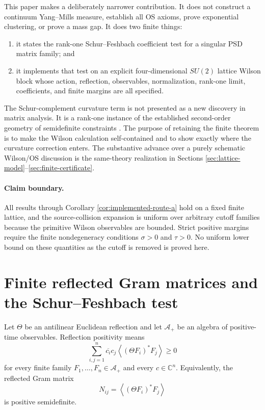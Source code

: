 \documentclass[11pt]{article}
\newcommand{\C}{\mathbb C}
\begin{document}
This paper makes a deliberately narrower contribution.  It does not construct a continuum Yang--Mills measure, establish all OS axioms, prove exponential clustering, or prove a mass gap.  It does two finite things:

\begin{enumerate}[label=(\roman*)]
  \item it states the rank-one Schur--Feshbach coefficient test for a singular PSD matrix family; and
  \item it implements that test on an explicit four-dimensional $SU(2)$ lattice Wilson block whose action, reflection, observables, normalization, rank-one limit, coefficients, and finite margins are all specified.
\end{enumerate}

The Schur-complement curvature term is not presented as a new discovery in matrix analysis.  It is a rank-one instance of the established second-order geometry of semidefinite constraints \cite{Shapiro1997,BonnansShapiro2000}.  The purpose of retaining the finite theorem is to make the Wilson calculation self-contained and to show exactly where the curvature correction enters.  The substantive advance over a purely schematic Wilson/OS discussion is the same-theory realization in Sections \ref{sec:lattice-model}--\ref{sec:finite-certificate}.

\paragraph{Claim boundary.}
All results through Corollary \ref{cor:implemented-route-a} hold on a fixed finite lattice, and the source-collision expansion is uniform over arbitrary cutoff families because the primitive Wilson observables are bounded.  Strict positive margins require the finite nondegeneracy conditions $\sigma>0$ and $\tau>0$.  No uniform lower bound on these quantities as the cutoff is removed is proved here.

\section{Finite reflected Gram matrices and the Schur--Feshbach test}
\label{sec:finite-theorem}

Let $\Theta$ be an antilinear Euclidean reflection and let $\mathcal A_+$ be an algebra of positive-time observables.  Reflection positivity means
\begin{equation}
  \sum_{i,j=1}^n\overline{c_i}c_j
  \left\langle (\Theta F_i)^*F_j\right\rangle\ge0
  \label{eq:os-positivity}
\end{equation}
for every finite family $F_1,\ldots,F_n\in\mathcal A_+$ and every $c\in\C^n$.  Equivalently, the reflected Gram matrix
\begin{equation}
  N_{ij}=\left\langle (\Theta F_i)^*F_j\right\rangle
  \label{eq:gram-general}
\end{equation}
is positive semidefinite.
\end{document}
